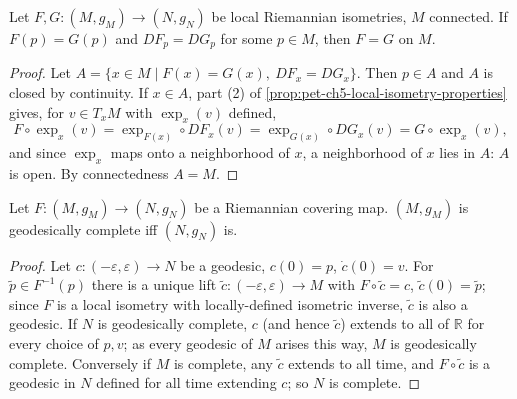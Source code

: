 \begin{proposition}
  \label{prop:pet-ch5-isometry-uniqueness}
  Let $F,G:(M,g_M)\to(N,g_N)$ be local Riemannian isometries, $M$ connected. If
  $F(p)=G(p)$ and $DF_p=DG_p$ for some $p\in M$, then $F=G$ on $M$.
\end{proposition}
\begin{proof}
  Let $A=\{x\in M\mid F(x)=G(x),\ DF_x=DG_x\}$. Then $p\in A$ and $A$ is closed by
  continuity. If $x\in A$, part (2) of \cref{prop:pet-ch5-local-isometry-properties}
  gives, for $v\in T_xM$ with $\exp_x(v)$ defined,
  \[
    F\circ\exp_x(v)=\exp_{F(x)}\circ DF_x(v)=\exp_{G(x)}\circ DG_x(v)=G\circ\exp_x(v),
  \]
  and since $\exp_x$ maps onto a neighborhood of $x$, a neighborhood of $x$ lies in
  $A$: $A$ is open. By connectedness $A=M$.
\end{proof}

\begin{proposition}
  \label{prop:pet-ch5-covering-completeness}
  Let $F:(M,g_M)\to(N,g_N)$ be a Riemannian covering map. $(M,g_M)$ is geodesically
  complete iff $(N,g_N)$ is.
\end{proposition}
\begin{proof}
  Let $c:(-\varepsilon,\varepsilon)\to N$ be a geodesic, $c(0)=p$, $\dot c(0)=v$. For
  $\tilde p\in F^{-1}(p)$ there is a unique lift $\tilde c:(-\varepsilon,\varepsilon)
  \to M$ with $F\circ\tilde c=c$, $\tilde c(0)=\tilde p$; since $F$ is a local
  isometry with locally-defined isometric inverse, $\tilde c$ is also a geodesic. If
  $N$ is geodesically complete, $c$ (and hence $\tilde c$) extends to all of
  $\mathbb R$ for every choice of $p,v$; as every geodesic of $M$ arises this way,
  $M$ is geodesically complete. Conversely if $M$ is complete, any $\tilde c$
  extends to all time, and $F\circ\tilde c$ is a geodesic in $N$ defined for all
  time extending $c$; so $N$ is complete.
\end{proof}

